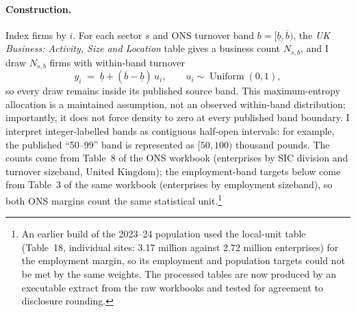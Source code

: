 \paragraph{Construction.} Index firms by $i$. For each sector $s$ and ONS
turnover band $b=[\underline{b},\overline{b})$, the \emph{UK Business: Activity,
Size and Location} table gives a business count $N_{s,b}$, and I draw $N_{s,b}$
firms with within-band turnover
\[
  y_i \;=\; \underline{b} + (\overline{b}-\underline{b})\,u_i,
  \qquad u_i \sim \operatorname{Uniform}(0,1),
\]
so every draw remains inside its published source band. This maximum-entropy
allocation is a maintained assumption, not an observed within-band
distribution; importantly, it does not force density to zero at every
published band boundary. I interpret integer-labelled bands as contiguous
half-open intervals: for example, the published ``50--99'' band is represented
as $[50,100)$ thousand pounds.
The counts come from Table~8 of the ONS workbook (enterprises by SIC division
and turnover sizeband, United Kingdom); the employment-band targets below come
from Table~3 of the same workbook (enterprises by employment sizeband), so both
ONS margins count the same statistical unit.\footnote{An earlier build of the
2023--24 population used the local-unit table (Table~18, individual sites:
3.17 million against 2.72 million enterprises) for the employment margin, so
its employment and population targets could not be met by the same weights.
The processed tables are now produced by an executable extract from the raw
workbooks and tested for agreement to disclosure rounding.}

